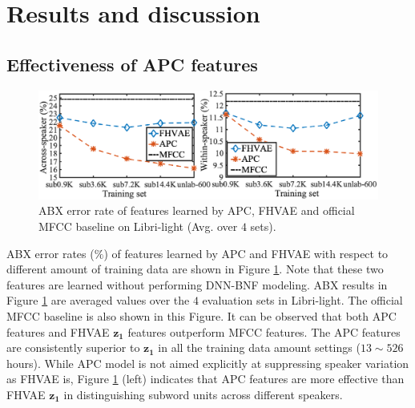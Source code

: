 \documentclass[a4paper]{article}
\begin{document}
\section{Results and discussion}
\subsection{Effectiveness of APC features }
\begin{figure}[!t]
    \centering
    \includegraphics[width=\linewidth]{apc_fhvae_mfcc.png}
    \caption{ABX error rate  of features learned by APC, FHVAE and official MFCC baseline on Libri-light (Avg. over $4$ sets). }
    \label{fig:apc_fhvae_mfcc}
\end{figure}
ABX error rates ($\%$) of features learned by APC and FHVAE with respect to different amount of training data are shown in Figure \ref{fig:apc_fhvae_mfcc}. Note that these two features are learned without performing DNN-BNF modeling. ABX results in  Figure \ref{fig:apc_fhvae_mfcc} are averaged values over the $4$ evaluation sets in Libri-light. The official MFCC baseline   \cite{kahn2019librilight} is also shown in this Figure. It can be observed that both APC features and FHVAE $\bm{z_1}$ features outperform MFCC features. The APC features are consistently superior to $\bm{z_1}$ in all the training data amount settings ($13 \sim 526$ hours). 
While APC model is not aimed explicitly at suppressing speaker variation as FHVAE is,   
Figure \ref{fig:apc_fhvae_mfcc} (left) indicates that APC features are more effective than FHVAE $\bm{z_1}$ in distinguishing subword units across different speakers.

\end{document}
